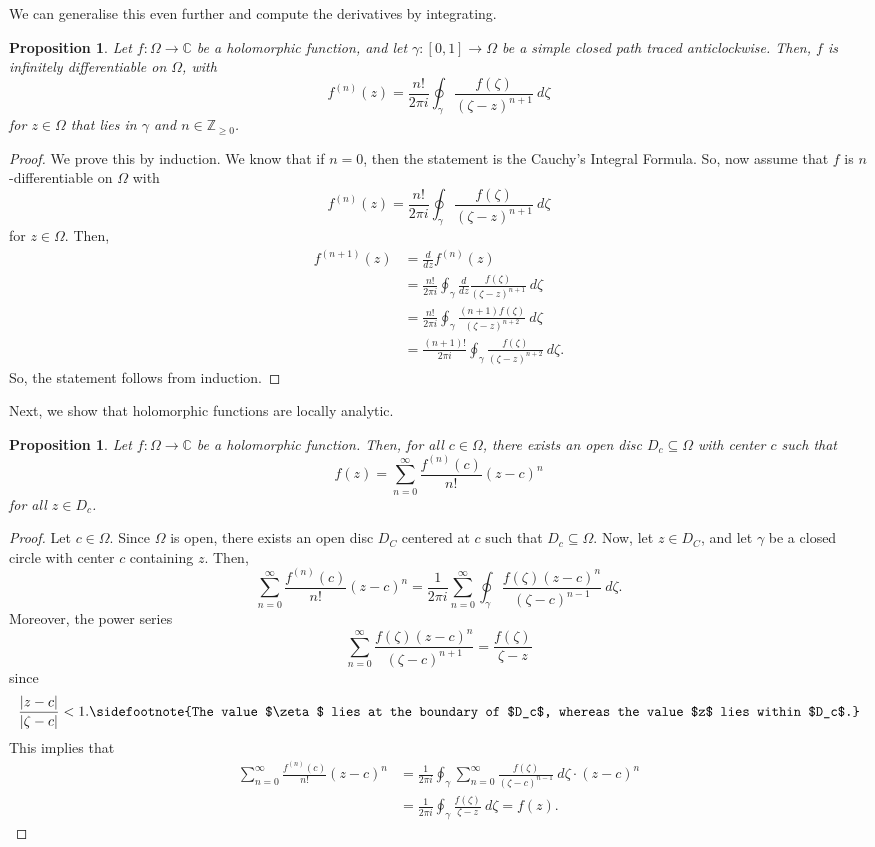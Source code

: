 \documentclass[a4paper, openany]{memoir}
\theoremstyle{definition}
\theoremstyle{plain}
\newtheorem{proposition}[definition]{Proposition}
\begin{document}
We can generalise this even further and compute the derivatives by integrating.
\begin{proposition}
Let $f: \Omega \to \mathbb{C}$ be a holomorphic function, and let $\gamma: [0, 1] \to \Omega$ be a simple closed path traced anticlockwise. Then, $f$ is infinitely differentiable on $\Omega$, with
\[f^{(n)}(z) = \frac{n!}{2\pi i} \oint_\gamma \frac{f(\zeta)}{(\zeta - z)^{n+1}} \ d\zeta\]
for $z \in \Omega$ that lies in $\gamma$ and $n \in \mathbb{Z}_{\geq 0}$.
\end{proposition}
\begin{proof}
We prove this by induction. We know that if $n = 0$, then the statement is the Cauchy's Integral Formula. So, now assume that $f$ is $n$-differentiable on $\Omega$ with
\[f^{(n)}(z) = \frac{n!}{2\pi i} \oint_\gamma \frac{f(\zeta)}{(\zeta - z)^{n+1}} \ d\zeta\]
for $z \in \Omega$. Then,
\begin{align*}
    f^{(n+1)}(z) &= \frac{d}{dz} f^{(n)}(z) \\
    &= \frac{n!}{2\pi i} \oint_\gamma \frac{d}{dz} \frac{f(\zeta)}{(\zeta - z)^{n+1}} \ d\zeta \\
    &= \frac{n!}{2\pi i} \oint_\gamma \frac{(n+1) f(\zeta)}{(\zeta - z)^{n+2}} \ d\zeta \\
    &= \frac{(n+1)!}{2\pi i} \oint_\gamma \frac{f(\zeta)}{(\zeta - z)^{n+2}} \ d\zeta.
\end{align*}
So, the statement follows from induction.
\end{proof}

Next, we show that holomorphic functions are locally analytic.
\begin{proposition}
Let $f: \Omega \to \mathbb{C}$ be a holomorphic function. Then, for all $c \in \Omega$, there exists an open disc $D_c \subseteq \Omega$ with center $c$ such that
\[f(z) = \sum_{n=0}^\infty \frac{f^{(n)}(c)}{n!} (z - c)^n\]
for all $z \in D_c$.
\end{proposition}
\begin{proof}
Let $c \in \Omega$. Since $\Omega$ is open, there exists an open disc $D_C$ centered at $c$ such that $D_c \subseteq \Omega$. Now, let $z \in D_C$, and let $\gamma$ be a closed circle with center $c$ containing $z$. Then,
\[\sum_{n=0}^\infty \frac{f^{(n)}(c)}{n!} (z - c)^n = \frac{1}{2\pi i} \sum_{n=0}^\infty \oint_\gamma \frac{f(\zeta) (z - c)^n}{(\zeta - c)^{n-1}} \ d\zeta.\]
Moreover, the power series
\[\sum_{n=0}^\infty \frac{f(\zeta) (z - c)^n}{(\zeta - c)^{n+1}} = \frac{f(\zeta)}{\zeta - z}\]
since
\[\frac{|z - c|}{|\zeta - c|} < 1.\sidefootnote{The value $\zeta$ lies at the boundary of $D_c$, whereas the value $z$ lies within $D_c$.}\]
This implies that
\begin{align*}
    \sum_{n=0}^\infty \frac{f^{(n)}(c)}{n!} (z - c)^n &= \frac{1}{2\pi i} \oint_\gamma \sum_{n=0}^\infty \frac{f(\zeta)}{(\zeta - c)^{n-1}} \  d\zeta \cdot (z - c)^n \\
    &= \frac{1}{2\pi i} \oint_\gamma \frac{f(\zeta)}{\zeta - z} \ d\zeta = f(z).
\end{align*}
\end{proof}
\end{document}
